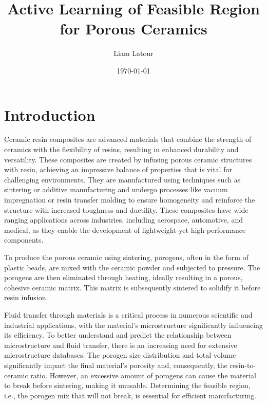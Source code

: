 \documentclass[10pt]{article}
\title{Active Learning of Feasible Region for Porous Ceramics}
\date{\today}
\author{Liam Latour}
\begin{document}
\begin{titlingpage}
\maketitle
\end{titlingpage}

\pagebreak

\section{Introduction}
\begin{multicols}{2}

Ceramic resin composites are advanced materials that combine the strength of ceramics with the flexibility of resins, resulting in enhanced durability and versatility. These composites are created by infusing porous ceramic structures with resin, achieving an impressive balance of properties that is vital for challenging environments. They are manufactured using techniques such as sintering\cite{leriche_sintering_2017} or additive manufacturing and undergo processes like vacuum impregnation or resin transfer molding to ensure homogeneity and reinforce the structure with increased toughness and ductility. These composites have wide-ranging applications across industries, including aerospace, automotive, and medical, as they enable the development of lightweight yet high-performance components.

To produce the porous ceramic using sintering\cite{ha_effect_2013}, porogens, often in the form of plastic beads, are mixed with the ceramic powder and subjected to pressure. The porogens are then eliminated through heating, ideally resulting in a porous, cohesive ceramic matrix. This matrix is subsequently sintered to solidify it before resin infusion.

Fluid transfer through materials is a critical process in numerous scientific and industrial applications, with the material's microstructure significantly influencing its efficiency. To better understand and predict the relationship between microstructure and fluid transfer, there is an increasing need for extensive microstructure databases. The porogen size distribution and total volume significantly impact the final material's porosity and, consequently, the resin-to-ceramic ratio. However, an excessive amount of porogens can cause the material to break before sintering, making it unusable. Determining the feasible region, i.e., the porogen mix that will not break, is essential for efficient manufacturing.


\end{multicols}
\end{document}
